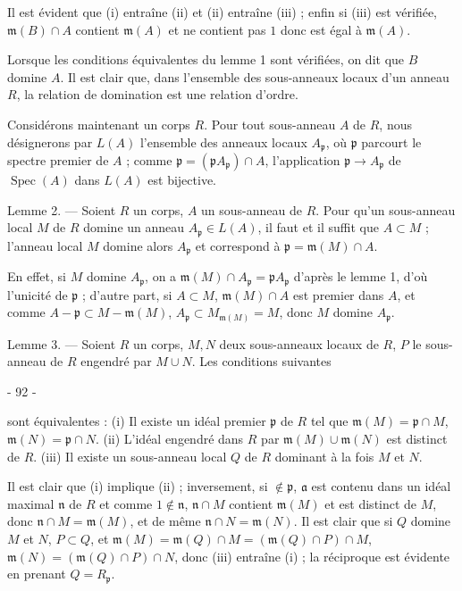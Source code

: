 Il est évident que (i) entraîne (ii) et (ii) entraîne (iii) ; enfin si (iii) est vérifiée, $\mathfrak{m}(B) \cap A$ contient $\mathfrak{m}(A)$ et ne contient pas $1$ donc est égal à $\mathfrak{m}(A)$.

Lorsque les conditions équivalentes du lemme 1 sont vérifiées, on dit que $B$ domine $A$. Il est clair que, dans l'ensemble des sous-anneaux locaux d'un anneau $R$, la relation de domination est une relation d'ordre.

Considérons maintenant un corps $R$. Pour tout sous-anneau $A$ de $R$, nous désignerons par $L(A)$ l'ensemble des anneaux locaux $A_{\mathfrak{p}}$, où $\mathfrak{p}$ parcourt le spectre premier de $A$ ; comme $\mathfrak{p} = (\mathfrak{p} A_{\mathfrak{p}}) \cap A$, l'application $\mathfrak{p} \to A_{\mathfrak{p}}$ de $\operatorname{Spec}(A)$ dans $L(A)$ est bijective.

Lemme 2. — Soient $R$ un corps, $A$ un sous-anneau de $R$. Pour qu'un sous-anneau local $M$ de $R$ domine un anneau $A_{\mathfrak{p}} \in L(A)$, il faut et il suffit que $A \subset M$ ; l'anneau local $M$ domine alors $A_{\mathfrak{p}}$ et correspond à $\mathfrak{p} = \mathfrak{m}(M) \cap A$.

En effet, si $M$ domine $A_{\mathfrak{p}}$, on a $\mathfrak{m}(M) \cap A_{\mathfrak{p}} = \mathfrak{p} A_{\mathfrak{p}}$ d'après le lemme 1, d'où l'unicité de $\mathfrak{p}$ ; d'autre part, si $A \subset M$, $\mathfrak{m}(M) \cap A$ est premier dans $A$, et comme $A - \mathfrak{p} \subset M - \mathfrak{m}(M)$, $A_{\mathfrak{p}} \subset M_{\mathfrak{m}(M)} = M$, donc $M$ domine $A_{\mathfrak{p}}$.

Lemme 3. — Soient $R$ un corps, $M, N$ deux sous-anneaux locaux de $R$, $P$ le sous-anneau de $R$ engendré par $M \cup N$. Les conditions suivantes

\newpage


- 92 -

sont équivalentes :
(i) Il existe un idéal premier $\mathfrak{p}$ de $R$ tel que $\mathfrak{m}(M) = \mathfrak{p} \cap M$, $\mathfrak{m}(N) = \mathfrak{p} \cap N$.
(ii) L'idéal engendré dans $R$ par $\mathfrak{m}(M) \cup \mathfrak{m}(N)$ est distinct de $R$.
(iii) Il existe un sous-anneau local $Q$ de $R$ dominant à la fois $M$ et $N$.

Il est clair que (i) implique (ii) ; inversement, si $\notin \mathfrak{p}$, $\mathfrak{a}$ est contenu dans un idéal maximal $\mathfrak{n}$ de $R$ et comme $1 \notin \mathfrak{n}$, $\mathfrak{n} \cap M$ contient $\mathfrak{m}(M)$ et est distinct de $M$, donc $\mathfrak{n} \cap M = \mathfrak{m}(M)$, et de même $\mathfrak{n} \cap N = \mathfrak{m}(N)$. Il est clair que si $Q$ domine $M$ et $N$, $P \subset Q$, et $\mathfrak{m}(M) = \mathfrak{m}(Q) \cap M = (\mathfrak{m}(Q) \cap P) \cap M$, $\mathfrak{m}(N) = (\mathfrak{m}(Q) \cap P) \cap N$, donc (iii) entraîne (i) ; la réciproque est évidente en prenant $Q = R_{\mathfrak{p}}$.

